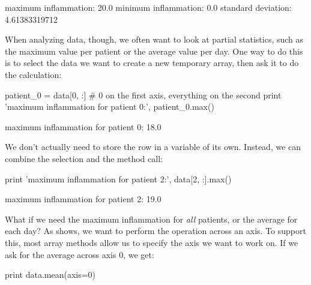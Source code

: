 \begin{VerbOut}
maximum inflammation: 20.0
minimum inflammation: 0.0
standard deviation: 4.61383319712
\end{VerbOut}

When analyzing data, though, we often want to look at partial
statistics, such as the maximum value per patient or the average value
per day. One way to do this is to select the data we want to create a
new temporary array, then ask it to do the calculation:

\begin{VerbIn}
patient_0 = data[0, :] # 0 on the first axis, everything on the second
print 'maximum inflammation for patient 0:', patient_0.max()
\end{VerbIn}

\begin{VerbOut}
maximum inflammation for patient 0: 18.0
\end{VerbOut}

We don't actually need to store the row in a variable of its own.
Instead, we can combine the selection and the method call:

\begin{VerbIn}
print 'maximum inflammation for patient 2:', data[2, :].max()
\end{VerbIn}

\begin{VerbOut}
maximum inflammation for patient 2: 19.0
\end{VerbOut}


What if we need the maximum inflammation for \emph{all} patients, or the
average for each day? As  shows, we want to perform the
operation across an axis.
To support this, most array methods allow us to specify the axis we want
to work on. If we ask for the average across axis 0, we get:

\begin{VerbIn}
print data.mean(axis=0)
\end{VerbIn}

\begin{VerbOut}
[  0.           0.45         1.11666667   1.75         2.43333333   3.15
   3.8          3.88333333   5.23333333   5.51666667   5.95         5.9
   8.35         7.73333333   8.36666667   9.5          9.58333333
  10.63333333  11.56666667  12.35        13.25        11.96666667
  11.03333333  10.16666667  10.           8.66666667   9.15         7.25
   7.33333333   6.58333333   6.06666667   5.95         5.11666667   3.6
   3.3          3.56666667   2.48333333   1.5          1.13333333
   0.56666667]
\end{VerbOut}

